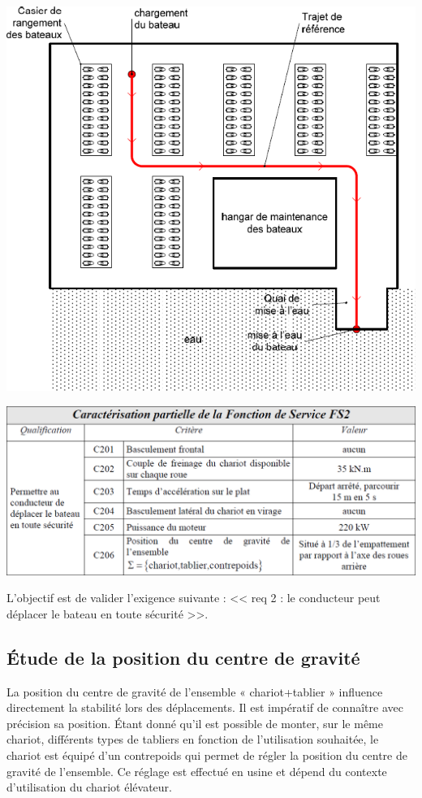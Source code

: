 \documentclass[10pt,fleqn]{article} %
\begin{document}
\begin{multicols}{2}
\begin{center}
\includegraphics[width=\linewidth]{images/fig_01}
\end{center}

\begin{center}
\includegraphics[width=\linewidth]{images/fig_02}
\end{center}

\begin{obj}
L'objectif est de valider l'exigence suivante : << req 2 : le conducteur peut déplacer le bateau en toute sécurité >>. 
\end{obj}
\subsection*{Étude de la position du centre de gravité}


La position du centre de gravité de l’ensemble « chariot+tablier » influence directement la stabilité lors des déplacements. Il est impératif de connaître avec précision sa position.
Étant donné qu’il est possible de monter, sur le même chariot, différents types de tabliers en fonction de l’utilisation souhaitée, le chariot est équipé d’un contrepoids qui permet de régler la position du centre de gravité de l’ensemble. Ce réglage est effectué en usine et dépend du contexte d’utilisation du chariot élévateur.


\end{multicols}
\end{document}
